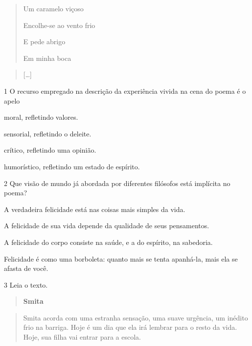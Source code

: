 \begin{quote}
Um caramelo viçoso

Encolhe-se ao vento frio

E pede abrigo

Em minha boca
\end{quote}

\begin{quote}
{[}\ldots{]}
\end{quote}


\num{1} O recurso empregado na descrição da experiência vivida na cena
do poema é o apelo

\begin{escolha}
\item moral, refletindo valores.

\item sensorial, refletindo o deleite.

\item crítico, refletindo uma opinião.

\item humorístico, refletindo um estado de espírito.
\end{escolha}

\num{2} Que visão de mundo já abordada por diferentes filósofos está
implícita no poema?

\begin{escolha}
\item A verdadeira felicidade está nas coisas mais simples da vida.

\item A felicidade de sua vida depende da qualidade de seus pensamentos.

\item A felicidade do corpo consiste na saúde, e a do espírito, na
sabedoria.

\item Felicidade é como uma borboleta: quanto mais se tenta apanhá-la, mais
ela se afasta de você.
\end{escolha}

\num{3} Leia o texto.

\begin{quote}
\textbf{Smita}
\end{quote}


\begin{quote}
Smita acorda com uma estranha sensação, uma suave urgência, um inédito
frio na barriga. Hoje é um dia que ela irá lembrar para o resto da vida.
Hoje, sua filha vai entrar para a escola.
\end{quote}

